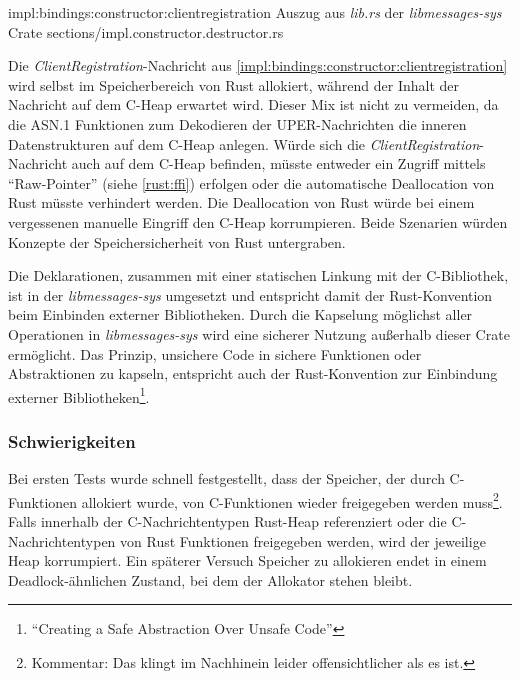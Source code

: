 \rustcinclude
	{impl:bindings:constructor:clientregistration}
	{Auszug aus \textit{lib.rs} der \textit{libmessages-sys} Crate}
	{sections/impl.constructor.destructor.rs}
	
Die \textit{ClientRegistration}-Nachricht aus \autoref{impl:bindings:constructor:clientregistration} wird selbst im Speicherbereich von Rust allokiert, während der Inhalt der Nachricht auf dem C-Heap erwartet wird.
Dieser Mix ist nicht zu vermeiden, da die ASN.1 Funktionen zum Dekodieren der UPER-Nachrichten die inneren Datenstrukturen auf dem C-Heap anlegen.
Würde sich die \textit{ClientRegistration}-Nachricht auch auf dem C-Heap befinden, müsste entweder ein Zugriff mittels \enquote{Raw-Pointer} (siehe \autoref{rust:ffi}) erfolgen oder die automatische Deallocation von Rust müsste verhindert werden.
Die Deallocation von Rust würde bei einem vergessenen manuelle Eingriff den C-Heap korrumpieren.
Beide Szenarien würden Konzepte der Speichersicherheit von Rust untergraben.

Die Deklarationen, zusammen mit einer statischen Linkung mit der C-Bibliothek, ist in der \textit{libmessages-sys} umgesetzt und entspricht damit der Rust-Konvention beim Einbinden externer Bibliotheken\cite{rust:cargo:build_scripts}.
Durch die Kapselung möglichst aller  Operationen in \textit{libmessages-sys} wird eine sicherer Nutzung außerhalb dieser Crate ermöglicht.
Das Prinzip, unsichere Code in sichere Funktionen oder Abstraktionen zu kapseln, entspricht auch der Rust-Konvention zur Einbindung externer Bibliotheken\footnote{\enquote{Creating a Safe Abstraction Over Unsafe Code}}\cite{rust:book:unsafe}.



\subsubsection{Schwierigkeiten}

Bei ersten Tests wurde schnell festgestellt, dass der Speicher, der durch C-Funktionen allokiert wurde, von C-Funktionen wieder freigegeben werden muss\footnote{Kommentar: Das klingt im Nachhinein leider offensichtlicher als es ist.}.
Falls innerhalb der C-Nachrichtentypen Rust-Heap referenziert oder die C-Nachrichtentypen von Rust Funktionen freigegeben werden, wird der jeweilige Heap korrumpiert.
Ein späterer Versuch Speicher zu allokieren endet in einem Deadlock-ähnlichen Zustand, bei dem der Allokator stehen bleibt.



